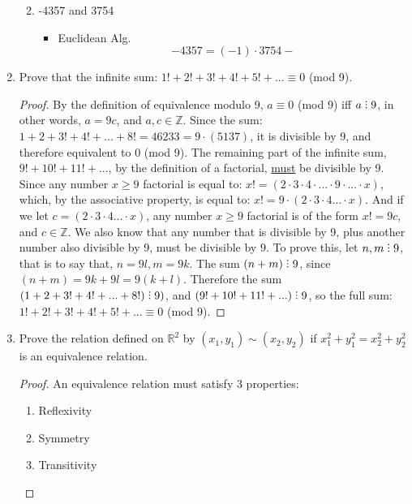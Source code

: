 \documentclass[12pt]{article}
\newcommand{\Z}{\mathbb{Z}}
\newcommand{\R}{\mathbb{R}}
\newcommand{\divby}{%
  \mathrel{\text{\vbox{\baselineskip.65ex\lineskiplimit0pt\hbox{.}\hbox{.}\hbox{.}}}}%
  }
\begin{document}
\begin{enumerate}
\begin{enumerate}
\begin{itemize}
        \end{itemize}
        \item -4357 and 3754
        \begin{itemize}
            \item Euclidean Alg. $$-4357=(-1)\cdot3754-$$
        \end{itemize}
    \end{enumerate}
    \item Prove that the infinite sum: $1!+2!+3!+4!+5!+...\equiv0$ (mod 9).
    \begin{proof}
    By the definition of equivalence modulo 9, $a\equiv0$ (mod 9) iff $a\divby9$, in other words, $a=9c$, and $a,c \in \Z$. Since the sum: $1+2+3!+4!+...+8!=46233=9\cdot(5137)$, it is divisible by 9, and therefore equivalent to 0 (mod 9). The remaining part of the infinite sum, $9!+10!+11!+...$, by the definition of a factorial, \underline{must} be divisible by 9. Since any number $x\geq9$ factorial is equal to: $x!=(2\cdot3\cdot4\cdot...\cdot9\cdot...\cdot x)$, which, by the associative property, is equal to: $x!=9\cdot(2\cdot3\cdot4...\cdot x)$. And if we let $c=(2\cdot3\cdot4...\cdot x)$, any number $x\geq9$ factorial is of the form $x!=9c$, and $c\in\Z$. We also know that any number that is divisible by 9, plus another number also divisible by 9, must be divisible by 9. To prove this, let $n,m\divby9$, that is to say that, $n=9l,m=9k$. The sum $(n+m)\divby9$, since $(n+m)=9k+9l=9(k+l)$. Therefore the sum $(1+2+3!+4!+...+8!)\divby9)$, and $(9!+10!+11!+...)\divby9$, so the full sum: $1!+2!+3!+4!+5!+...\equiv0$ (mod 9).
    \end{proof}
    \item Prove the relation defined on $\R^{2}$ by $(x_{1},y_{1})\sim(x_{2}, y_{2})$ if $x_{1}^{2}+y_{1}^{2}=x_{2}^{2}+y_{2}^{2}$ is an equivalence relation.
    \begin{proof}
    An equivalence relation must satisfy 3 properties:\begin{enumerate}
        \item Reflexivity
        \item Symmetry
        \item Transitivity
    \end{enumerate}

\end{proof}
\end{enumerate}
\end{document}
